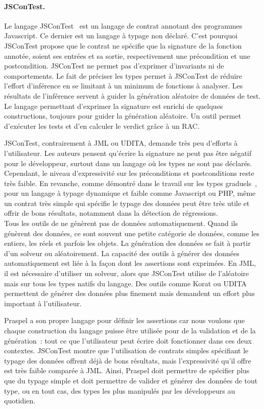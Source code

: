 \paragraph{JSConTest.} Le langage JSConTest~ est un langage
de contrat annotant des programmes Javascript. Ce dernier est un langage à
typage non déclaré. C'est pourquoi JSConTest propose que le contrat ne spécifie
que la signature de la fonction annotée, soient ses entrées et sa sortie,
respectivement une précondition et une postcondition. JSConTest ne permet pas
d'exprimer d'invariants ni de comportements. Le fait de préciser les types
permet à JSConTest de réduire l'effort d'inférence en se limitant à un minimum
de fonctions à analyser. Les résultats de l'inférence servent à guider la
génération aléatoire de données de test. Le langage permettant d'exprimer la
signature est enrichi de quelques constructions, toujours pour guider la
génération aléatoire. Un outil permet d'exécuter les tests et d'en calculer le
verdict grâce à un RAC.

JSConTest, contrairement à JML ou UDITA, demande très peu d'efforts à
l'utilisateur. Les auteurs pensent qu'écrire la signature ne peut pas être
négatif pour le développeur, surtout dans un langage où les types ne sont pas
déclarés. Cependant, le niveau d'expressivité sur les préconditions et
postconditions reste très faible. En revanche, comme démontré dans le travail
sur les types graduels~, pour un langage à typage dynamique et
faible comme Javascript ou PHP, même un contrat très simple qui spécifie le
typage des données peut être très utile et offrir de bons résultats, notamment
dans la détection de régressions. \\

Tous les outils de  ne génèrent pas de données
automatiquement. Quand ils génèrent des données, ce sont souvent une petite
catégorie de données, comme les entiers, les réels et parfois les objets. La
génération des données se fait à partir d'un solveur ou aléatoirement. La
capacité des outils à générer des données automatiquement est liée à la façon
dont les assertions sont exprimées. En JML, il est nécessaire d'utiliser un
solveur, alors que JSConTest utilise de l'aléatoire mais sur tous les types
natifs du langage. Des outils comme Korat ou UDITA permettent de générer des
données plus finement mais demandent un effort plus important à l'utilisateur.

Praspel a son propre langage pour définir les assertions car nous voulons que
chaque construction du langage puisse être utilisée pour de la validation
{\strong et} de la génération~: tout ce que l'utilisateur peut écrire doit
fonctionner dans ces deux contextes. JSConTest montre que l'utilisation de
contrats simples spécifiant le typage des données offrent déjà de bons
résultats, mais l'expressivité qu'il offre est très faible comparée à JML.
Ainsi, Praspel doit permettre de spécifier plus que du typage simple et doit
permettre de valider et générer des données de tout type, ou en tout cas, des
types les plus manipulés par les développeurs au quotidien.
